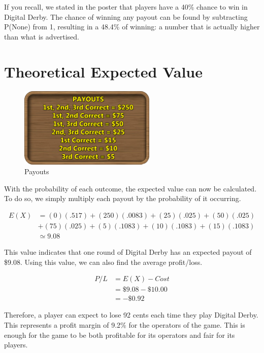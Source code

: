 \documentclass{article}
\begin{document}
\vspace{2ex}

If you recall, we stated in the poster that players have a 40\% chance to win in Digital Derby. The chance of winning any payout can be found by subtracting P(None) from 1, resulting in a 48.4\% of winning: a number that is actually higher than what is advertised.

\vspace{26ex}

\section{Theoretical Expected Value}

\begin{figure}[h]
\centering
\includegraphics[width=6.5cm]{images/payouts.png}
\caption{Payouts}
\end{figure}

{With the probability of each outcome, the expected value can now be calculated. To do so, we simply multiply each payout by the probability of it occurring.
\vspace{2ex}

\begin{equation}
    \begin{split}
        E(X) &= (0)(.517) + (250)(.0083) + (25)(.025) + (50)(.025)\\ &+ (75)(.025) + (5)(.1083) + (10)(.1083) + (15)(.1083)\\
        &\simeq 9.08 
    \end{split}
\end{equation}
\vspace{2ex}

This value indicates that one round of Digital Derby has an expected payout of \$9.08. Using this value, we can also find the average profit/loss.

\begin{equation}
    \begin{split}
        P/L &= E(X) - Cost\\
       &= \$9.08 - \$10.00\\
       &= -\$0.92
    \end{split}
\end{equation}
\vspace{2ex}

Therefore, a player can expect to lose 92 cents each time they play Digital Derby. This represents a profit margin of 9.2\% for the operators of the game. This is enough for the game to be both profitable for its operators and fair for its players.
}
\end{document}
